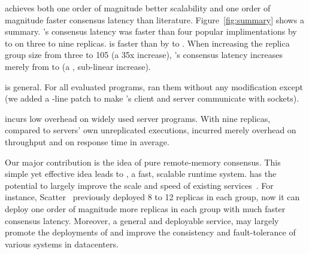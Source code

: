 \begin{tightenum}
\item \xxx achieves both one order of magnitude better scalability and one
order of magnitude faster consensus latency than literature.
Figure~\ref{fig:summary} shows a summary. \xxx's consensus latency was faster
than four popular \paxos implimentations by \comptradlow to \comptradhigh on
three to nine replicas. \xxx is faster than \dare by \fasterDARElow to
\fasterDARE. When increasing the replica group size from three to 105 (a 35x
increase), \xxx's consensus latency increases merely from \xxxlatencythree to
\xxxlatencyonezerofive (a \xxxscalability, sub-linear increase).

\item \xxx is general. For all \nprog evaluated programs, \xxx ran them without
any modification except \calvin (we added a \nlinescalvin-line patch to make
\calvin's client and server communicate with sockets).

\item \xxx incurs low overhead on \nprog widely used server programs.
With nine replicas, compared to servers' own unreplicated executions, \xxx
incurred merely \tputoverhead overhead on throughput and \latencyoverhead on
response time in average.








\end{tightenum}

Our major contribution is the idea of pure remote-memory consensus. This simple
yet effective idea leads to \xxx, a fast, scalable \paxos runtime system. \xxx
has the potential to largely improve the scale and speed of existing \paxos
services~\cite{scatter:sosp11,manos:hotdep10,crane:sosp15,rex:eurosys14}. For
instance, Scatter~\cite{scatter:sosp11} previously deployed 8 to 12 replicas in
each \paxos group, now it can deploy one order of magnitude more replicas in
each group with much faster consensus latency. Moreover, a general and
deployable service, \xxx may largely promote the deployments of \paxos and
improve the consistency and fault-tolerance of various systems in datacenters.

